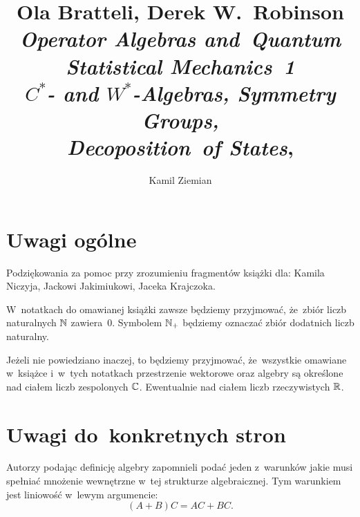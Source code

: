 \documentclass[a4paper,11pt]{article}
\title{Ola Bratteli, Derek W.~Robinson \\
  \textit{Operator Algebras and~Quantum Statistical Mechanics~1} \\
  \textit{$C^{ * }$- and $W^{ * }$-Algebras, Symmetry Groups,} \\
  \textit{Decoposition~of States},
  \cite{BratteliRobinsonOperatorAlgebrasETCVolI2002}}
\author{Kamil Ziemian}
\begin{document}





\maketitle





\section{Uwagi ogólne}

\label{sec:Uwagi-ogolne}



\noindent
Podziękowania za pomoc przy zrozumieniu fragmentów książki dla: Kamila
Niczyja, Jackowi Jakimiukowi, Jaceka Krajczoka.

\VerSpaceFour






W~notatkach do omawianej książki zawsze będziemy przyjmować, że~zbiór liczb
naturalnych $\mathbb{N}$ zawiera~$0$. Symbolem $\mathbb{N}_{ + }$ będziemy oznaczać
zbiór dodatnich liczb naturalny.

\VerSpaceFour





Jeżeli nie powiedziano inaczej, to będziemy przyjmować, że~wszystkie
omawiane w~książce i~w~tych notatkach przestrzenie wektorowe oraz algebry są
określone nad ciałem liczb zespolonych $\mathbb{C}$. Ewentualnie nad ciałem
liczb rzeczywistych $\mathbb{R}$.

\VerSpaceFour







\section{Uwagi do~konkretnych stron}

\label{sec:Uwagi-do-konkrentych-stron}



\noindent
{} Autorzy podając definicję algebry zapomnieli podać jeden z~warunków
jakie musi spełniać mnożenie wewnętrzne w~tej strukturze algebraicznej. Tym
warunkiem jest liniowość w~lewym argumencie:
\begin{equation}
  \label{eq:Bratteli-Robinson-Operator-Algebras-ETC-Vol-I-s01-01}
  ( A + B ) C = A C + B C.
\end{equation}
\end{document}
